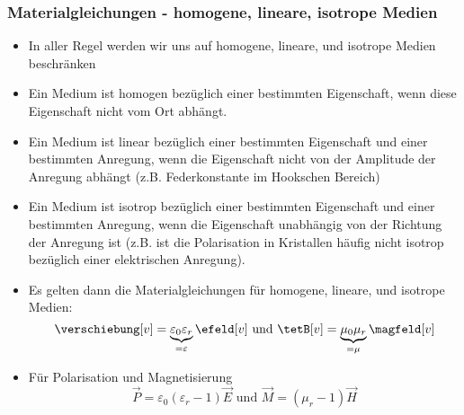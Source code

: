        \begin{frame}
         \frametitle{Materialgleichungen - homogene, lineare, isotrope
           Medien}
         \begin{itemize}[<+->]
           \item In aller Regel werden wir uns auf \alert{homogene,
               lineare, und isotrope Medien} beschränken
             \item Ein Medium ist \alert{homogen} bezüglich einer
               bestimmten Eigenschaft, wenn diese Eigenschaft nicht
               vom \alert{Ort} abhängt. 
               \item Ein Medium ist \alert{linear} bezüglich einer
                 bestimmten Eigenschaft und einer bestimmten Anregung,
                 wenn die Eigenschaft nicht von der \alert{Amplitude} der
                 Anregung abhängt (z.B. Federkonstante im Hookschen
                 Bereich)
                 \item Ein Medium ist \alert{isotrop} bezüglich einer
                   bestimmten Eigenschaft und einer bestimmten
                   Anregung, wenn die Eigenschaft unabhängig von der
                   \alert{Richtung} der Anregung ist (z.B. ist die
                   Polarisation in Kristallen häufig nicht isotrop
                   bezüglich einer elektrischen Anregung).
                   \item Es gelten dann die
                     \alert{Materialgleichungen für homogene,
                       lineare, und isotrope Medien}:
                     $$ \verschiebung[v] =
                     \underbrace{\varepsilon_0\varepsilon_r}_{=\varepsilon}
                     \efeld[v] \text{ und } \tetB[v] =
                     \underbrace{\mu_0  \mu_r}_{=\mu} \magfeld[v] $$
                   \item Für Polarisation und Magnetisierung
              $$\vec{P} = \varepsilon_0(\varepsilon_r - 1) \vec{E}
              \text{ und }  \vec{M} = (\mu_r-1) \vec{H}$$
           \end{itemize}
         \end{frame}

